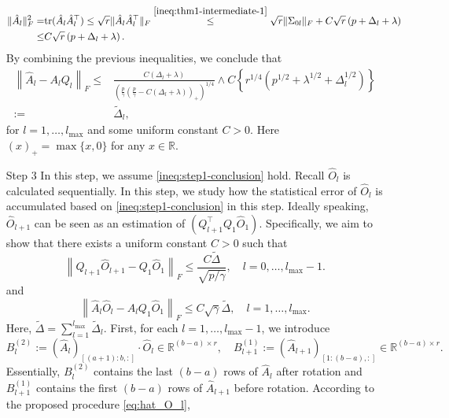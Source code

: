 \documentclass[11pt]{article}
\newcommand{\0}{{\mathbf{0}}}
\newcommand{\1}{{\mathbf{1}}}
\newcommand{\tr}{{\rm tr}}
\begin{document}
\begin{enumerate}[leftmargin=*]
\begin{equation*}
\begin{split}
	\|\hat{A}_l\|_F^2 = & \tr(\hat{A}_l\hat{A}_l^\top) \leq  \sqrt{r}\|\hat{A}_l\hat{A}_l^\top\|_F \overset{\eqref{ineq:thm1-intermediate-1}}{\leq} \sqrt{r}\|\Sigma_{0l}\|_F +  C\sqrt{r}\left(p + \Delta_l+\lambda\right)\\
	\leq & C\sqrt{r}\left(p + \Delta_l + \lambda\right).
	\end{split}
	\end{equation*}
	By combining the previous inequalities, we conclude that 
	\begin{equation}\label{ineq:step1-conclusion}
	\begin{split}
	\left\|\hat{A}_{l} - A_{l} Q_{l} \right\|_F \leq & \frac{C(\Delta_l + \lambda)}{\left(\frac{p}{\gamma}\left(\frac{p}{\gamma} - C(\Delta_l+\lambda)\right)_+\right)^{1/4}}\wedge C\left\{r^{1/4}(p^{1/2}+\lambda^{1/2}+\Delta_l^{1/2})\right\}\\ 
	:= & \tilde{\Delta}_l,
	\end{split}
	\end{equation}
	for $ l = 1,\ldots, l_{\max}$ and some uniform constant $C>0$. Here $(x)_+ = \max\{x, 0\}$ for any $x\in \mathbb{R}$.
	\item[Step 3] In this step, we assume \eqref{ineq:step1-conclusion} hold. Recall $\hat{O}_l$ is calculated sequentially. In this step, we study how the statistical error of $\hat{O}_l$ is accumulated based on \eqref{ineq:step1-conclusion} in this step. Ideally speaking, $\hat{O}_{l+1}$ can be seen as an estimation of $(Q_{l+1}^\top Q_1\hat{O}_1)$. Specifically, we aim to show that there exists a uniform constant $C>0$ such that 
	\begin{equation}\label{ineq:induction}
	\left\|Q_{l+1} \hat{O}_{l+1}  - Q_1 \hat{O}_1 \right\|_F  \leq \frac{C\tilde{\Delta}}{\sqrt{p/\gamma}}, \quad l=0,\ldots, l_{\max}-1.
	\end{equation}
	and 
	\begin{equation}\label{ineq:A_lO_l-A_lO_1}
	\left\|\hat{A}_l \hat{O}_l - A_l Q_1 \hat{O}_1\right\|_F \leq C\sqrt{\gamma}\tilde{\Delta}, \quad l=1,\ldots, l_{\max}.
	\end{equation}
	Here, $\tilde{\Delta} = \sum_{l=1}^{l_{\max}} \tilde{\Delta}_l$. First, for each $l=1,\ldots, l_{\max}-1$, we introduce
	\begin{equation*}
	B_l^{(2)} := (\hat{A}_{l})_{[(a+1):b, :]}\cdot \hat{O}_l \in \mathbb{R}^{(b-a) \times r},\quad B_{l+1}^{(1)} := (\hat{A}_{l+1})_{[1:(b-a), :]} \in \mathbb{R}^{(b-a) \times r}.
	\end{equation*}
	Essentially, $B_l^{(2)}$ contains the last $(b-a)$ rows of $\hat{A}_l$ after rotation and $B_{l+1}^{(1)}$ contains the first $(b-a)$ rows of $\hat{A}_{l+1}$ before rotation. According to the proposed procedure \eqref{eq:hat_O_l}, 

\end{enumerate}
\end{document}
